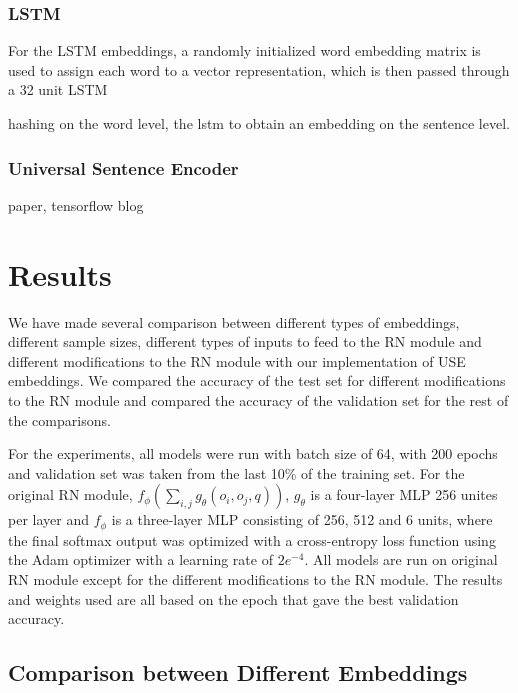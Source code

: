 \documentclass{article}
\begin{document}





\subsubsection{LSTM}
For the LSTM embeddings, a randomly initialized word embedding matrix is used to assign each word to a vector representation, which is then passed through a 32 unit LSTM

hashing on the word level, the lstm to obtain an embedding on the sentence level.

\subsubsection{Universal Sentence Encoder}
paper, tensorflow blog

\section{Results}


We have made several comparison between different types of embeddings, different sample sizes, different types of inputs to feed to the RN module and different modifications to the RN module with our implementation of USE embeddings. We compared the accuracy of the test set for different modifications to the RN module and compared the accuracy of the validation set for the rest of the comparisons.

 

For the experiments, all models were run with batch size of 64, with 200 epochs and validation set was taken from the last 10\% of the training set. For the original RN module, $f_\phi \left(\sum_{i,j} g_\theta (o_i,o_j,q)\right)$, $g_\theta$ is a four-layer MLP 256 unites per layer and $f_\phi$ is a three-layer MLP consisting of 256, 512 and 6 units, where the final softmax output was optimized with a cross-entropy loss function using the Adam optimizer with a learning rate of $2e^{-4}$. All models are run on original RN module except for the different modifications to the RN module. The results and weights used are all based on the epoch that gave the best validation accuracy.

 

 

\subsection{Comparison between Different Embeddings}
\end{document}

